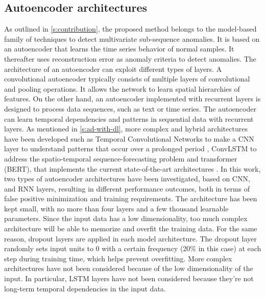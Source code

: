 \subsection{Autoencoder architectures}
\label{ss:architectures}
As outlined in \autoref{s:contribution}, the proposed method belongs to the model-based family of techniques to detect multivariate sub-sequence anomalies. It is based on an autoencoder that learns the time series behavior of normal samples. It thereafter uses reconstruction error as anomaly criteria to detect anomalies. 
The architecture of an autoencoder can exploit different types of layers. A convolutional autoencoder typically consists of multiple layers of convolutional and pooling operations. It allows the network to learn spatial hierarchies of features. On the other hand, an autoencoder implemented with recurrent layers is designed to process data sequences, such as text or time series. The autoencoder can learn temporal dependencies and patterns in sequential data with recurrent layers. As mentioned in \autoref{s:ad-with-dl}, more complex and hybrid architectures have been developed such as Temporal Convolutional Networks to  make a CNN layer to understand patterns that occur over a prolonged period \cite{Lea_2016}, ConvLSTM to address the spatio-temporal sequence-forecasting problem \cite{Shi_2015} and transformer (BERT), that implements the current state-of-the-art architectures \cite{Devlin_2018}. In this work, two types of autoencoder architectures have been investigated, based on CNN, and RNN layers, resulting in different performance outcomes, both in terms of false positive minimization and training requirements. The architecture has been kept small, with no more than four layers and a few thousand learnable parameters. Since the input data has a low dimensionality, too much complex architecture will be able to memorize and overfit the training data. For the same reason, dropout layers are applied in each model architecture. The dropout layer randomly sets input units to 0 with a certain frequency (20\% in this case) at each step during training time, which helps prevent overfitting. More complex architectures have not been considered because of the low dimensionality of the input. In particular, LSTM layers have not been considered because they're not long-term temporal dependencies in the input data. 

